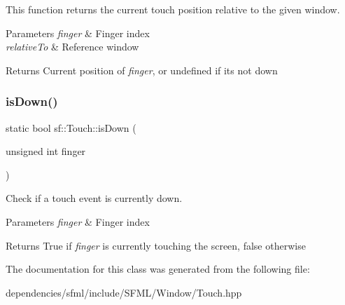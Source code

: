 This function returns the current touch position relative to the given window.


\begin{DoxyParams}{Parameters}
{\em finger} & Finger index \\
\hline
{\em relative\+To} & Reference window\\
\hline
\end{DoxyParams}
\begin{DoxyReturn}{Returns}
Current position of {\itshape finger}, or undefined if it\textquotesingle{}s not down 
\end{DoxyReturn}
\mbox{\label{classsf_1_1_touch_a2f85297123ea4e401d02c346e50d48a3}} 
\subsubsection{\texorpdfstring{is\+Down()}{isDown()}}
{\footnotesize\ttfamily static bool sf\+::\+Touch\+::is\+Down (\begin{DoxyParamCaption}\item[{unsigned int}]{finger }\end{DoxyParamCaption})\hspace{0.3cm}{\ttfamily [static]}}



Check if a touch event is currently down. 


\begin{DoxyParams}{Parameters}
{\em finger} & Finger index\\
\hline
\end{DoxyParams}
\begin{DoxyReturn}{Returns}
True if {\itshape finger} is currently touching the screen, false otherwise 
\end{DoxyReturn}


The documentation for this class was generated from the following file\+:\begin{DoxyCompactItemize}
\item 
dependencies/sfml/include/\+S\+F\+M\+L/\+Window/Touch.\+hpp\end{DoxyCompactItemize}
